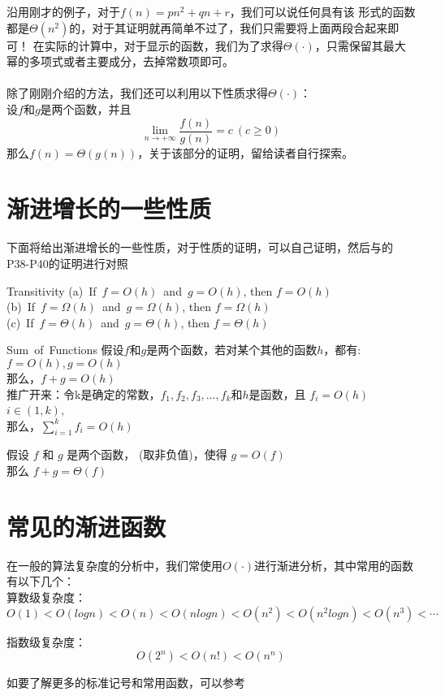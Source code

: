 沿用刚才的例子，对于$f(n)=pn^2+qn+r$，我们可以说任何具有该
形式的函数都是$\Theta(n^2)$的，对于其证明就再简单不过了，我们只需要将上面两段合起来即可！
在实际的计算中，对于显示的函数，我们为了求得$\Theta(\cdot)$，只需保留其最大幂的多项式或者主要成分，去掉常数项即可。
\\
\\
除了刚刚介绍的方法，我们还可以利用以下性质求得$\Theta(\cdot)$：
\\
设$f$和$g$是两个函数，并且
\[
   \lim_{n\rightarrow+\infty}\frac{f(n)}{g(n)} = c \ (c\ge 0)
\]
那么$f(n)=\Theta(g(n))$，关于该部分的证明，留给读者自行探索。


\section{渐进增长的一些性质}
下面将给出渐进增长的一些性质，对于性质的证明，可以自己证明，然后与\cite{textbook1}的P38-P40的证明进行对照
\begin{theorem}{Transitivity}{}
   (a)\ If\ $f=O(h)$\ and\ $g=O(h)$, then $f=O(h)$\\
   (b)\ If\ $f=\Omega(h)$\ and\ $g=\Omega(h)$, then $f=\Omega(h)$\\
   (c)\ If\ $f=\Theta(h)$\ and\ $g=\Theta(h)$, then $f=\Theta(h)$
\end{theorem}

\begin{theorem}{Sum\ of\ Functions}{}
   假设$f$和$g$是两个函数，若对某个其他的函数$h$，都有:$f=O(h),g=O(h)$\\
   那么，$f+g=O(h)$\\
   推广开来：令k是确定的常数，$f_1,f_2,f_3,\ldots,f_k$和$h$是函数，且
   $f_i=O(h)$ \ \ $i\in (1,k)$,\\
   那么，$\sum^{k}_{i=1}f_i=O(h)$
\end{theorem}

\begin{theorem}{}{}
   假设 $f$ 和 $g$ 是两个函数， (取非负值)，使得 $g = O(f)$ \\
   那么 $f+g=\Theta(f)$
\end{theorem}

\section{常见的渐进函数}
在一般的算法复杂度的分析中，我们常使用$O(\cdot)$进行渐进分析，其中常用的函数有以下几个：\\
算数级复杂度：
\[
O(1)<O(logn)<O(n)<O(nlogn)<O(n^2)<O(n^2logn)<O(n^3)< \cdots
\]

指数级复杂度：
\[
O(2^n)<O(n!)<O(n^n)
\]

如要了解更多的标准记号和常用函数，可以参考~\cite{cormen2009introduction}
